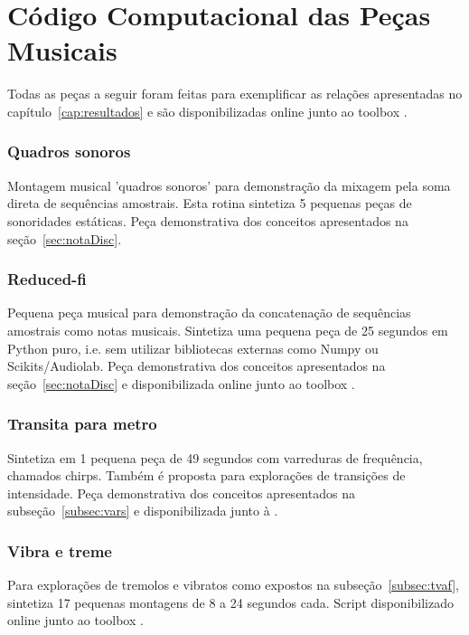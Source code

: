 \chapter{Código Computacional das Peças Musicais}
\label{cap:codigoPecas}
Todas as peças a seguir foram feitas para exemplificar as relações apresentadas no capítulo~\ref{cap:resultados} e são disponibilizadas online junto ao toolbox \massa.\cite{MASSA}


\subsection{Quadros sonoros}\label{ap:quadros}
Montagem musical 'quadros sonoros' para demonstração da mixagem pela soma direta de sequências amostrais. Esta rotina sintetiza 5 pequenas peças de sonoridades estáticas. Peça demonstrativa dos conceitos apresentados na seção~\ref{sec:notaDisc}.

\subsection{Reduced-fi}\label{ap:reduced}
Pequena peça musical para demonstração da concatenação de sequências amostrais como notas musicais. Sintetiza uma pequena peça de 25 segundos em Python puro, i.e. sem utilizar bibliotecas externas como Numpy ou Scikits/Audiolab. Peça demonstrativa dos conceitos apresentados na seção~\ref{sec:notaDisc} e disponibilizada online junto ao toolbox \massa.\cite{MASSA}



\subsection{Transita para metro}\label{ap:transita}
Sintetiza em 1 pequena peça de 49 segundos com varreduras de frequência, chamados chirps. Também é proposta para explorações de transições de intensidade. Peça demonstrativa dos conceitos apresentados na subseção~\ref{subsec:vars} e disponibilizada junto à \massa.\cite{MASSA}

\subsection{Vibra e treme}\label{ap:vibra}
Para explorações de tremolos e vibratos como expostos na subseção~\ref{subsec:tvaf}, sintetiza 17 pequenas montagens de 8 a 24 segundos cada. Script disponibilizado online junto ao toolbox \massa.\cite{MASSA}



